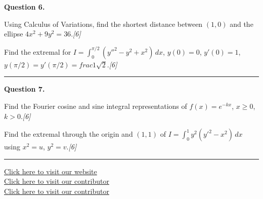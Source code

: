 \documentclass[11pt,a4paper]{article}
\newcommand{\pts}[1]{\hfill   \textit{[#1]}}
\begin{document}
\medskip


\noindent   \textbf{Question 6.}

\begin{parts}
  \item Using Calculus of Variations, find the shortest distance between $(1,0)$ and the ellipse $4x^2+9y^2=36$.\pts{6}
  \item Find the extremal for $I=\int_0^{\pi/2}(y''^2-y^2+x^2)\,dx$, $y(0)=0$, $y'(0)=1$, $y(\pi/2)=y'(\pi/2)= frac{1}{\sqrt{2}}$.\pts{6}
\end{parts}
\medskip\rule{\linewidth}{0.2pt}

\medskip


\noindent   \textbf{Question 7.}

\begin{parts}
  \item Find the Fourier cosine and sine integral representations of $f(x)=e^{-kx}$, $x\geq0$, $k>0$.\pts{6}
  \item Find the extremal through the origin and $(1,1)$ of $I=\int_0^1 y^2(y'^2-x^2)\,dx$ using $x^2=u$, $y^2=v$.\pts{6}
\end{parts}

\vfill\rule{\linewidth}{0.4pt}

\begin{center}\small
\href{https://bhu-exam.vercel.app/}{Click here to visit our website}\\[4pt]
\href{https://me-aryan.vercel.app/}{Click here to visit our contributor}\\[4pt]
\href{https://quashan-me.vercel.app/}{Click here to visit our contributor}
\end{center}
\end{document}
